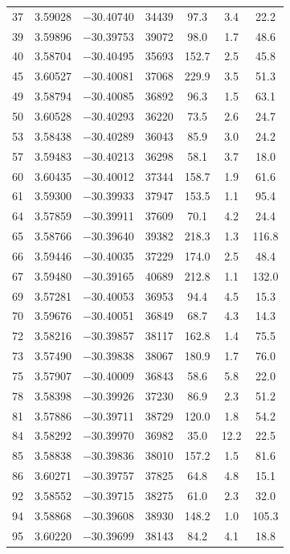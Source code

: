 \documentclass{aa}
\begin{document}
\begin{appendix}
\begin{longtable}{c c c c c c c}
37 & 3.59028 & $-$30.40740 & 34439 & 97.3 & 3.4 & 22.2 \\
39 & 3.59896 & $-$30.39753 & 39072 & 98.0 & 1.7 & 48.6 \\
40 & 3.58704 & $-$30.40495 & 35693 & 152.7 & 2.5 & 45.8 \\
45 & 3.60527 & $-$30.40081 & 37068 & 229.9 & 3.5 & 51.3 \\
49 & 3.58794 & $-$30.40085 & 36892 & 96.3 & 1.5 & 63.1 \\
50 & 3.60528 & $-$30.40293 & 36220 & 73.5 & 2.6 & 24.7 \\
53 & 3.58438 & $-$30.40289 & 36043 & 85.9 & 3.0 & 24.2 \\
57 & 3.59483 & $-$30.40213 & 36298 & 58.1 & 3.7 & 18.0 \\
60 & 3.60435 & $-$30.40012 & 37344 & 158.7 & 1.9 & 61.6 \\
61 & 3.59300 & $-$30.39933 & 37947 & 153.5 & 1.1 & 95.4 \\
64 & 3.57859 & $-$30.39911 & 37609 & 70.1 & 4.2 & 24.4 \\
65 & 3.58766 & $-$30.39640 & 39382 & 218.3 & 1.3 & 116.8 \\
66 & 3.59446 & $-$30.40035 & 37229 & 174.0 & 2.5 & 48.4 \\
67 & 3.59480 & $-$30.39165 & 40689 & 212.8 & 1.1 & 132.0 \\
69 & 3.57281 & $-$30.40053 & 36953 & 94.4 & 4.5 & 15.3 \\
70 & 3.59676 & $-$30.40051 & 36849 & 68.7 & 4.3 & 14.3 \\
72 & 3.58216 & $-$30.39857 & 38117 & 162.8 & 1.4 & 75.5 \\
73 & 3.57490 & $-$30.39838 & 38067 & 180.9 & 1.7 & 76.0 \\
75 & 3.57907 & $-$30.40009 & 36843 & 58.6 & 5.8 & 22.0 \\
78 & 3.58398 & $-$30.39926 & 37230 & 86.9 & 2.3 & 51.2 \\
81 & 3.57886 & $-$30.39711 & 38729 & 120.0 & 1.8 & 54.2 \\
84 & 3.58292 & $-$30.39970 & 36982 & 35.0 & 12.2 & 22.5 \\
85 & 3.58838 & $-$30.39836 & 38010 & 157.2 & 1.5 & 81.6 \\
86 & 3.60271 & $-$30.39757 & 37825 & 64.8 & 4.8 & 15.1 \\
92 & 3.58552 & $-$30.39715 & 38275 & 61.0 & 2.3 & 32.0 \\
94 & 3.58868 & $-$30.39608 & 38930 & 148.2 & 1.0 & 105.3 \\
95 & 3.60220 & $-$30.39699 & 38143 & 84.2 & 4.1 & 18.8 \\

\end{longtable}
\end{appendix}
\end{document}
